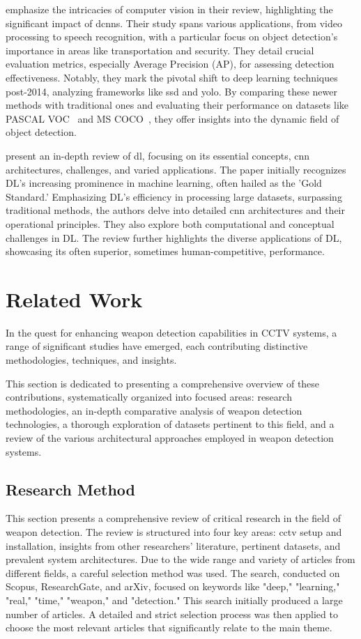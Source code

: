 \citet{rfc9} emphasize the intricacies of computer vision in their review, highlighting the significant impact of \ac{dcnns}. Their study spans various applications, from video processing to speech recognition, with a particular focus on object detection's importance in areas like transportation and security. They detail crucial evaluation metrics, especially Average Precision (AP), for assessing detection effectiveness. Notably, they mark the pivotal shift to deep learning techniques post-2014, analyzing frameworks like \ac{ssd} and \ac{yolo}. By comparing these newer methods with traditional ones and evaluating their performance on datasets like PASCAL VOC~\cite{rfc27} and MS COCO~\cite{rfc16}, they offer insights into the dynamic field of object detection.

\citet{rfc10} present an in-depth review of \ac{dl}, focusing on its essential concepts, \ac{cnn} architectures, challenges, and varied applications. The paper initially recognizes DL's increasing prominence in machine learning, often hailed as the 'Gold Standard.' Emphasizing DL's efficiency in processing large datasets, surpassing traditional methods, the authors delve into detailed \ac{cnn} architectures and their operational principles. They also explore both computational and conceptual challenges in DL. The review further highlights the diverse applications of DL, showcasing its often superior, sometimes human-competitive, performance.

\section{Related Work}
In the quest for enhancing weapon detection capabilities in CCTV systems, a range of significant studies have emerged, each contributing distinctive methodologies, techniques, and insights. 

This section is dedicated to presenting a comprehensive overview of these contributions, systematically organized into focused areas: research methodologies, an in-depth comparative analysis of weapon detection technologies, a thorough exploration of datasets pertinent to this field, and a review of the various architectural approaches employed in weapon detection systems.

\subsection{Research Method}
This section presents a comprehensive review of critical research in the field of weapon detection. The review is structured into four key areas: \ac{cctv} setup and installation, insights from other researchers' literature, pertinent datasets, and prevalent system architectures. Due to the wide range and variety of articles from different fields, a careful selection method was used. The search, conducted on Scopus, ResearchGate, and arXiv, focused on keywords like "deep," "learning," "real," "time," "weapon," and "detection." This search initially produced a large number of articles. A detailed and strict selection process was then applied to choose the most relevant articles that significantly relate to the main theme.

